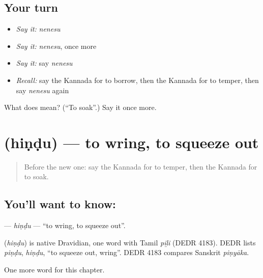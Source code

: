 \subsection*{Your turn}
\begin{itemize}
\raggedright
  \item \emph{Say it:} \emph{nenesu}
  \item \emph{Say it:} \emph{nenesu}, once more
  \item \emph{Say it:} say \emph{nenesu}
  \item \emph{Recall:} say the Kannada for to borrow, then the Kannada for to temper, then say \emph{nenesu} again
\end{itemize}

\begin{tcolorbox}[breakable,colback=teal!4,colframe=teal!35!black,title={Before you move on}]
What does  mean? (\textquotedblleft{}To soak\textquotedblright{}.) Say it once more.
\end{tcolorbox}
\section[\texorpdfstring{\kn{ಹಿಂಡು} (hiṇḍu)}{ಹಿಂಡು (hiṇḍu)}]{ (hiṇḍu) — to wring, to squeeze out}

\label{lesson:KA-C242-hindu}



\begin{quote}
Before the new one: say the Kannada for to temper, then the Kannada for to soak.
\end{quote}

\subsection*{You'll want to know: }
\textbf{} — \emph{hiṇḍu} — \textquotedblleft{}to wring, to squeeze out\textquotedblright{}.

\begin{cousinweb}
\textbf{} (\emph{hiṇḍu}) is native Dravidian, one word with Tamil \emph{piḻi} (DEDR 4183). DEDR lists \emph{piṇḍu}, \emph{hiṇḍu}, \textquotedblleft{}to squeeze out, wring\textquotedblright{}. DEDR 4183 compares Sanskrit \emph{piṇyāka}.
\end{cousinweb}

\begin{grammarlens}[title={What you've built}]
One more word for this chapter.
\end{grammarlens}

